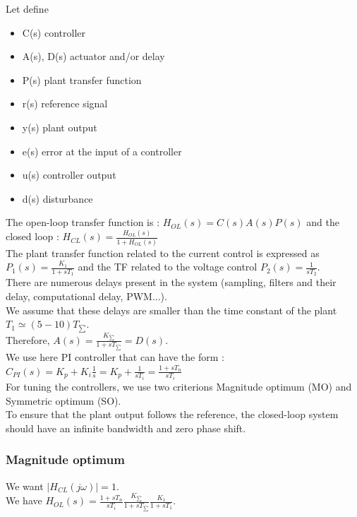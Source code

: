 \documentclass[../main.tex]{subfiles}
\begin{document}
Let define \begin{itemize}
    \item C(s) controller
    \item A(s), D(s) actuator and/or delay
    \item P(s) plant transfer function
    \item r(s) reference signal
    \item y(s) plant output
    \item e(s) error at the input of a controller
    \item u(s) controller output
    \item d(s) disturbance
\end{itemize}
The open-loop transfer function is : $H_{OL}(s) = C(s) A(s) P(s)$ and the closed loop : $H_{CL}(s) = \frac{H_{OL}(s)}{1+H_{OL}(s)}$\\

The plant transfer function related to the current control is expressed as $P_1(s) = \frac{K_1}{1+sT_1}$ and the TF related to the voltage control $P_2(s) = \frac{1}{sT_2}$.\\

There are numerous delays present in the system (sampling, filters and their delay, computational delay, PWM...).\\
We assume that these delays are smaller than the time constant of the plant $T_1 \simeq (5-10) T_{\sum}$.\\

Therefore, $A(s) = \frac{K_{\sum}}{1+sT_{\sum}} = D(s)$.\\

We use here PI controller that can have the form : $C_{PI}(s) = K_p + K_i \frac{1}{s} = K_p + \frac{1}{sT_i} = \frac{1+sT_n}{sT_i}$\\

\warning For tuning the controllers, we use two criterions Magnitude optimum (MO) and Symmetric optimum (SO).\\

\warning To ensure that the plant output follows the reference, the closed-loop system should have an infinite bandwidth and zero phase shift.\\

\subsubsection{Magnitude optimum}
We want $\lvert H_{CL}(j\omega) \rvert = 1$. \\
We have $H_{OL}(s) = \frac{1+sT_n}{sT_i} \frac{K_{\sum}}{1+sT_{\sum}} \frac{K_1}{1+sT_1}$.\\
\end{document}
